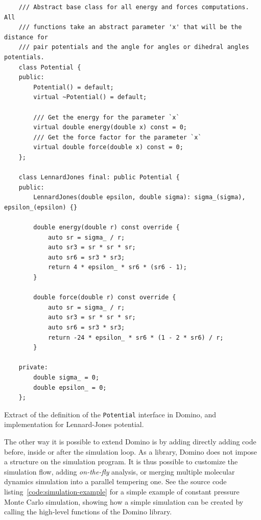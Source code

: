 \documentclass[thesis]{subfiles}
\begin{document}
\newpage
\begin{listing}[ht]
    \begin{verbatim}
    /// Abstract base class for all energy and forces computations. All
    /// functions take an abstract parameter 'x' that will be the distance for
    /// pair potentials and the angle for angles or dihedral angles potentials.
    class Potential {
    public:
        Potential() = default;
        virtual ~Potential() = default;

        /// Get the energy for the parameter `x`
        virtual double energy(double x) const = 0;
        /// Get the force factor for the parameter `x`
        virtual double force(double x) const = 0;
    };

    class LennardJones final: public Potential {
    public:
        LennardJones(double epsilon, double sigma): sigma_(sigma), epsilon_(epsilon) {}

        double energy(double r) const override {
            auto sr = sigma_ / r;
            auto sr3 = sr * sr * sr;
            auto sr6 = sr3 * sr3;
            return 4 * epsilon_ * sr6 * (sr6 - 1);
        }

        double force(double r) const override {
            auto sr = sigma_ / r;
            auto sr3 = sr * sr * sr;
            auto sr6 = sr3 * sr3;
            return -24 * epsilon_ * sr6 * (1 - 2 * sr6) / r;
        }

    private:
        double sigma_ = 0;
        double epsilon_ = 0;
    };
    \end{verbatim}
    \caption{Extract of the definition of the \texttt{Potential} interface in
    Domino, and implementation for Lennard-Jones potential.}
    \label{code:potential}
\end{listing}

The other way it is possible to extend Domino is by adding directly adding code
before, inside or after the simulation loop. As a library, Domino does not
impose a structure on the simulation program. It is thus possible to customize
the simulation flow, adding \emph{on-the-fly} analysis, or merging multiple
molecular dynamics simulation into a parallel tempering one. See the source code
listing~\ref{code:simulation-example} for a simple example of constant pressure
Monte Carlo simulation, showing how a simple simulation can be created by
calling the high-level functions of the Domino library.
\end{document}
